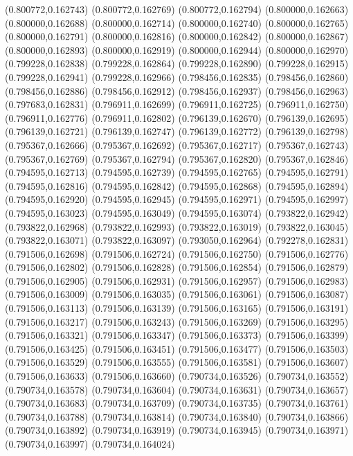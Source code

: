 (0.800772,0.162743)
(0.800772,0.162769)
(0.800772,0.162794)
(0.800000,0.162663)
(0.800000,0.162688)
(0.800000,0.162714)
(0.800000,0.162740)
(0.800000,0.162765)
(0.800000,0.162791)
(0.800000,0.162816)
(0.800000,0.162842)
(0.800000,0.162867)
(0.800000,0.162893)
(0.800000,0.162919)
(0.800000,0.162944)
(0.800000,0.162970)
(0.799228,0.162838)
(0.799228,0.162864)
(0.799228,0.162890)
(0.799228,0.162915)
(0.799228,0.162941)
(0.799228,0.162966)
(0.798456,0.162835)
(0.798456,0.162860)
(0.798456,0.162886)
(0.798456,0.162912)
(0.798456,0.162937)
(0.798456,0.162963)
(0.797683,0.162831)
(0.796911,0.162699)
(0.796911,0.162725)
(0.796911,0.162750)
(0.796911,0.162776)
(0.796911,0.162802)
(0.796139,0.162670)
(0.796139,0.162695)
(0.796139,0.162721)
(0.796139,0.162747)
(0.796139,0.162772)
(0.796139,0.162798)
(0.795367,0.162666)
(0.795367,0.162692)
(0.795367,0.162717)
(0.795367,0.162743)
(0.795367,0.162769)
(0.795367,0.162794)
(0.795367,0.162820)
(0.795367,0.162846)
(0.794595,0.162713)
(0.794595,0.162739)
(0.794595,0.162765)
(0.794595,0.162791)
(0.794595,0.162816)
(0.794595,0.162842)
(0.794595,0.162868)
(0.794595,0.162894)
(0.794595,0.162920)
(0.794595,0.162945)
(0.794595,0.162971)
(0.794595,0.162997)
(0.794595,0.163023)
(0.794595,0.163049)
(0.794595,0.163074)
(0.793822,0.162942)
(0.793822,0.162968)
(0.793822,0.162993)
(0.793822,0.163019)
(0.793822,0.163045)
(0.793822,0.163071)
(0.793822,0.163097)
(0.793050,0.162964)
(0.792278,0.162831)
(0.791506,0.162698)
(0.791506,0.162724)
(0.791506,0.162750)
(0.791506,0.162776)
(0.791506,0.162802)
(0.791506,0.162828)
(0.791506,0.162854)
(0.791506,0.162879)
(0.791506,0.162905)
(0.791506,0.162931)
(0.791506,0.162957)
(0.791506,0.162983)
(0.791506,0.163009)
(0.791506,0.163035)
(0.791506,0.163061)
(0.791506,0.163087)
(0.791506,0.163113)
(0.791506,0.163139)
(0.791506,0.163165)
(0.791506,0.163191)
(0.791506,0.163217)
(0.791506,0.163243)
(0.791506,0.163269)
(0.791506,0.163295)
(0.791506,0.163321)
(0.791506,0.163347)
(0.791506,0.163373)
(0.791506,0.163399)
(0.791506,0.163425)
(0.791506,0.163451)
(0.791506,0.163477)
(0.791506,0.163503)
(0.791506,0.163529)
(0.791506,0.163555)
(0.791506,0.163581)
(0.791506,0.163607)
(0.791506,0.163633)
(0.791506,0.163660)
(0.790734,0.163526)
(0.790734,0.163552)
(0.790734,0.163578)
(0.790734,0.163604)
(0.790734,0.163631)
(0.790734,0.163657)
(0.790734,0.163683)
(0.790734,0.163709)
(0.790734,0.163735)
(0.790734,0.163761)
(0.790734,0.163788)
(0.790734,0.163814)
(0.790734,0.163840)
(0.790734,0.163866)
(0.790734,0.163892)
(0.790734,0.163919)
(0.790734,0.163945)
(0.790734,0.163971)
(0.790734,0.163997)
(0.790734,0.164024)

